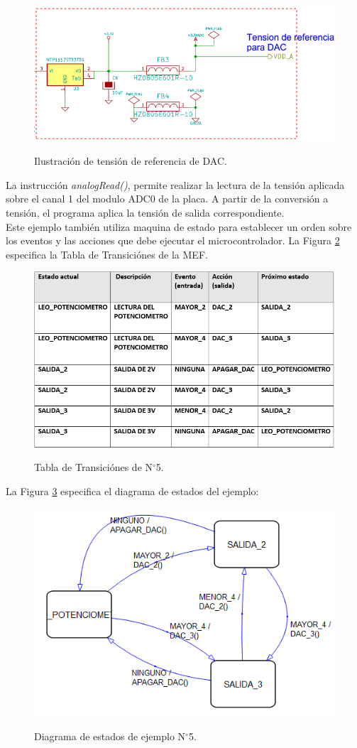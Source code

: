 \documentclass[12pt,letterpaper]{article}
\begin{document}
\begin{figure}[H]
\centering
\includegraphics[width=10 cm]{figuras/f8.png}\\
\caption{Ilustración de tensión de referencia de DAC.}
\label{Fig26}
\end{figure}


La instrucción \textit{analogRead()}, permite realizar la lectura de la tensión aplicada sobre el canal 1 del modulo ADC0 de la placa. A partir de la conversión a tensión, el programa aplica la tensión de salida correspondiente.
 \\
 
Este ejemplo también utiliza maquina de estado para establecer un orden sobre los eventos y las acciones que debe ejecutar el microcontrolador. La Figura \ref{tablatransicionej5} especifica la Tabla de Transiciónes de la MEF.
\begin{figure}[H]
\centering
\includegraphics[width=10 cm]{figuras/IMAGEN-EJEMPLO5.png}\\
\caption{Tabla de Transiciónes de N$^{\circ}$5.}
\label{tablatransicionej5}
\end{figure}

La Figura \ref{diagramaej5} especifica el diagrama de estados del ejemplo:

\begin{figure}[H]
\centering
\includegraphics[width=10 cm]{figuras/f10.png}\\
\caption{Diagrama de estados de ejemplo N$^{\circ}$5.}
\label{diagramaej5}
\end{figure}
\end{document}
